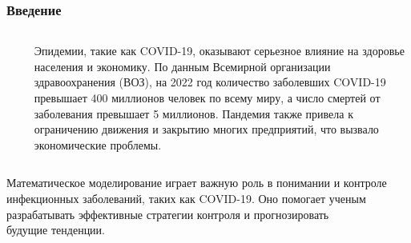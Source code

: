 \documentclass[
    11pt, %
    aspectratio=169, %
]{beamer}
\begin{document}
\begin{frame}
	\frametitle{Введение}
            
            \begin{columns}[t] %
                \begin{column}{0.25\textwidth} %
                    \begin{figure}[h!] 
                    \end{figure}
                \end{column}
                  \begin{column}{0.70\textwidth} %
                    Эпидемии, такие как COVID-19, оказывают серьезное влияние на здоровье населения и экономику. По данным Всемирной организации здравоохранения (ВОЗ), на 2022 год количество заболевших COVID-19 превышает 400 миллионов человек по всему миру, а число смертей от заболевания превышает 5 миллионов. Пандемия также привела к ограничению движения и закрытию многих предприятий, что вызвало экономические проблемы. 
                \end{column}
            \end{columns}

            \medskip
            Математическое моделирование играет важную роль в понимании и контроле инфекционных заболеваний, таких как COVID-19. Оно помогает ученым разрабатывать эффективные стратегии контроля и прогнозировать \\ будущие тенденции.



\end{frame}
\end{document}
